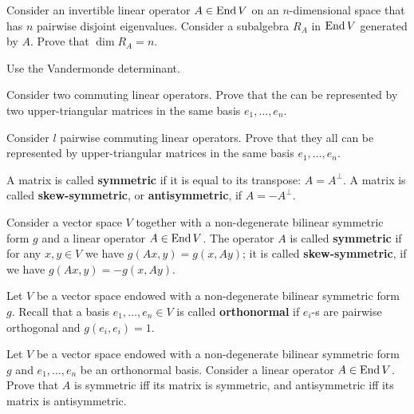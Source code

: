 \documentclass[12pt]{article}
\begin{document}
\begin{zadacha}[*]
Consider an invertible linear operator  $A\in \operatorname{End} V$ on an
$n$-dimensional space that has  $n$ pairwise disjoint eigenvalues.
Consider a subalgebra $R_A$ in $\operatorname{End} V$ generated by $A$.
Prove that $\dim R_A=n$. 
\end{zadacha}

\begin{ukazanie}
Use the Vandermonde determinant.
\end{ukazanie}

\begin{zadacha}[*]
  Consider two commuting linear operators. Prove that the can be
  represented by two upper-triangular matrices in the same basis $e_1,
  \dots, e_n$.
\end{zadacha}

\begin{zadacha}[*]
  Consider $l$ pairwise commuting linear operators.  Prove that they
  all can be represented by upper-triangular matrices in the same
  basis $e_1, \dots, e_n$.
\end{zadacha}


\begin{opredelenie}
A matrix is called {\bf symmetric}
if it is equal to its transpose: $A = A^\bot$.
A matrix is called {\bf skew-symmetric}, or
{\bf antisymmetric}, if $A = - A^\bot$.
\end{opredelenie}

\begin{opredelenie}
Consider a vector space $V$ together with a non-degenerate bilinear
symmetric form $g$ and a linear operator $A\in \operatorname{End} V$. The operator
$A$ is called {\bf symmetric} if for any  $x, y\in V$ we have
$g(Ax, y) = g(x, Ay)$; it is called {\bf skew-symmetric},
if we have $g(Ax, y) = -g(x, Ay)$.
\end{opredelenie}

\begin{opredelenie}
Let $V$ be a vector space endowed with a non-degenerate bilinear
symmetric form $g$. Recall that a basis $e_1, \dots, e_n\in V$ is
called {\bf orthonormal} if  $e_i$-s are pairwise orthogonal and
$g(e_i,e_i)=1$. 
\end{opredelenie}

\begin{zadacha}
Let $V$ be a vector space endowed with a non-degenerate bilinear
symmetric form  $g$ and $e_1, \dots, e_n$ be an orthonormal
basis. Consider a linear operator $A\in \operatorname{End} V$. Prove that $A$ is
symmetric iff its matrix is symmetric, and antisymmetric iff its
matrix is antisymmetric.
\end{zadacha}
\end{document}
